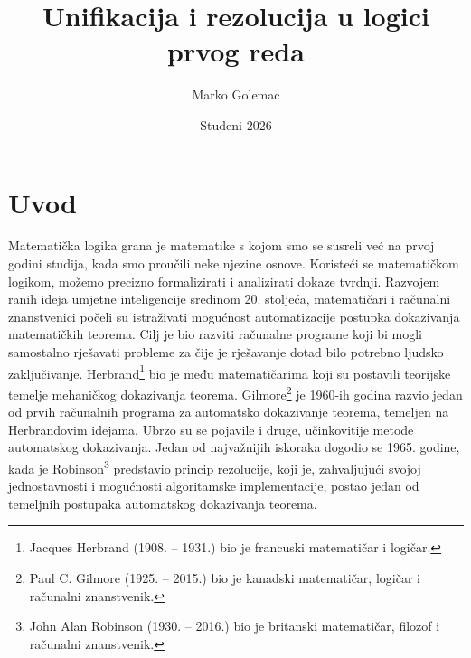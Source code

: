 \documentclass{article}
\title{Unifikacija i rezolucija u logici prvog reda}
\author{Marko Golemac}
\date{Studeni 2026}
\theoremstyle{definition}
\theoremstyle{plain}
\begin{document}
\maketitle

\section{Uvod}
Matematička logika grana je matematike s kojom smo se susreli već na prvoj godini studija, kada smo proučili neke njezine osnove. Koristeći se matematičkom logikom, možemo precizno formalizirati i analizirati dokaze tvrdnji. Razvojem ranih ideja umjetne inteligencije sredinom 20. stoljeća, matematičari i računalni znanstvenici počeli su istraživati mogućnost automatizacije postupka dokazivanja matematičkih teorema. Cilj je bio razviti računalne programe koji bi mogli samostalno rješavati probleme za čije je rješavanje dotad bilo potrebno ljudsko zaključivanje. Herbrand\footnote{Jacques Herbrand (1908. – 1931.) bio je francuski matematičar i logičar.} bio je među matematičarima koji su postavili teorijske temelje mehaničkog dokazivanja teorema. Gilmore\footnote{Paul C. Gilmore (1925. – 2015.) bio je kanadski matematičar, logičar i računalni znanstvenik.} je 1960-ih godina razvio jedan od prvih računalnih programa za automatsko dokazivanje teorema, temeljen na Herbrandovim idejama. Ubrzo su se pojavile i druge, učinkovitije metode automatskog dokazivanja. Jedan od najvažnijih iskoraka dogodio se 1965. godine, kada je Robinson\footnote{John Alan Robinson (1930. – 2016.) bio je britanski matematičar, filozof i računalni znanstvenik.} predstavio princip rezolucije, koji je, zahvaljujući svojoj jednostavnosti i mogućnosti algoritamske implementacije, postao jedan od temeljnih postupaka automatskog dokazivanja teorema.
\end{document}
